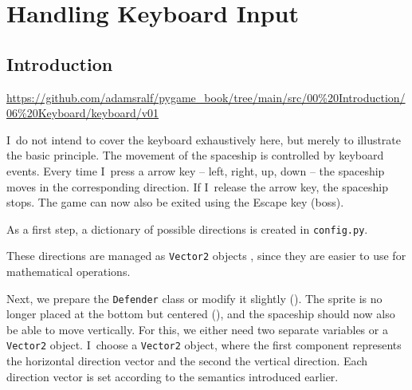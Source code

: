 \newpage
\section{Handling Keyboard Input}\label{secTastatur}
\subsection{Introduction}\label{KeyboardByEvent}
\begin{diskbox}
	\url{https://github.com/adamsralf/pygame_book/tree/main/src/00%20Introduction/06%20Keyboard/keyboard/v01}
\end{diskbox}

I~do not intend to cover the keyboard exhaustively here, but merely to illustrate the basic principle. The movement of the spaceship is controlled by keyboard events. Every time I~press a arrow key -- left, right, up, down -- the spaceship moves in the corresponding direction. If I~release the arrow key, the spaceship stops. The game can now also be exited using the Escape key (\Gls{boss}).

As a first step, a dictionary of possible directions is created in \texttt{config.py}. 
\begin{hintbox}[Vector2]
	These directions are managed as \texttt{Vector2} objects , since they are easier to use for mathematical operations.
\end{hintbox}



Next, we prepare the \texttt{Defender} class or modify it slightly (). The sprite is no longer placed at the bottom but centered (), and the spaceship should now also be able to move vertically. For this, we either need two separate variables or a \texttt{Vector2} object. I~choose a \texttt{Vector2} object, where the first component represents the horizontal direction vector and the second the vertical direction. Each direction vector is set according to the semantics introduced earlier. 


